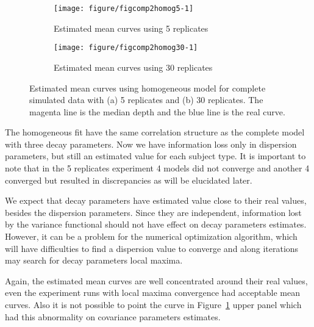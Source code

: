 \begin{figure}[!t]
  \centering
  \begin{subfigure}{\textwidth}
    \centering
\begin{knitrout}
\color{fgcolor}
\texttt{[image: figure/figcomp2homog5-1]} 

\end{knitrout}
    \caption{Estimated mean curves using 5 replicates}
  \end{subfigure}
  \begin{subfigure}{\textwidth}
    \centering
\begin{knitrout}
\color{fgcolor}
\texttt{[image: figure/figcomp2homog30-1]} 

\end{knitrout}
    \caption{Estimated mean curves using 30 replicates}
  \end{subfigure}
  \caption{Estimated mean curves using homogeneous model for complete simulated data with (a) 5 replicates and (b) 30 replicates. The magenta line is the median depth and the blue line is the real curve.}
  \label{fig:mpc-comp2homog}
\end{figure}

The homogeneous fit have the same correlation structure as the complete model with three decay parameters. Now we have information loss only in dispersion parameters, but still an estimated value for each subject type. It is important to note that in the 5 replicates experiment 4 models did not converge and another 4 converged but resulted in discrepancies as will be elucidated later.

We expect that decay parameters have estimated value close to their real values, besides the dispersion parameters. Since they are independent, information lost by the variance functional should not have effect on decay parameters estimates. However, it can be a problem for the numerical optimization algorithm, which will have difficulties to find a dispersion value to converge and along iterations may search for decay parameters local maxima.

Again, the estimated mean curves are well concentrated around their real values, even the experiment runs with local maxima convergence had acceptable mean curves. Also it is not possible to  point the curve in Figure~\ref{fig:mpc-comp2homog} upper panel which had this abnormality on covariance parameters estimates.

